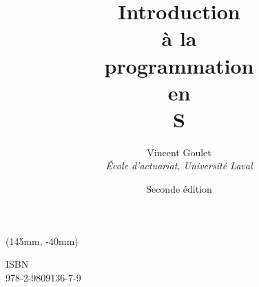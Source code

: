 \documentclass[letterpaper,10pt]{memoir}
\title{\HUGE
    \fontseries{ub}\selectfont Introduction \\
    \fontseries{m}\selectfont  à la \\
    \fontseries{ub}\selectfont programmation \\
    \fontseries{m}\selectfont  en \\
    \fontseries{ub}\selectfont S}
\author{\huge Vincent Goulet \\[3mm]
    \large \textit{École d'actuariat, Université Laval}}
\date{\Large Seconde édition}
\newcommand{\ISBN}{978-2-9809136-7-9}
\theoremstyle{plain}
\theoremstyle{remark}
\theoremstyle{definition}
\begin{document}
\renewcommand{\FrenchLabelItem}{\small$\sqbullet$}
\renewcommand{\labelitemii}{\textendash}


\frontmatter

\pagestyle{empty}


\pagestyle{companion}

\tableofcontents*

\mainmatter










\appendix








\cleardoublepage
\printindex

\cleardoublepage
\cleartoverso

\pagestyle{empty}
\pagestyle{empty}
\renewcommand{\ttdefault}{hlst}

\bandeverso
\begin{textblock*}{71mm}(145mm, -40mm)
  \large\ttfamily\raggedright
  \textblockcolor{}
  ISBN \\ \ISBN
\end{textblock*}
\end{document}
